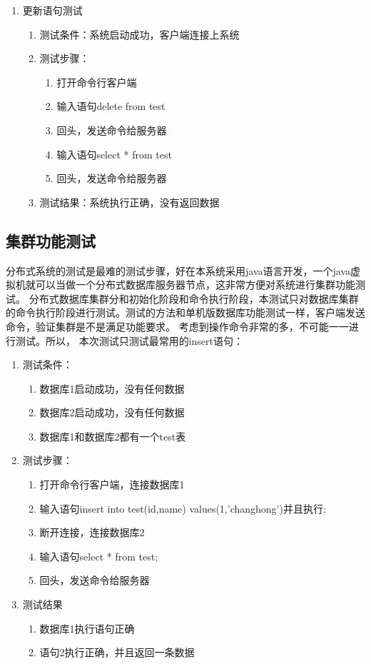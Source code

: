 \begin{enumerate}
\item 更新语句测试
\begin{enumerate}
	\item 测试条件：系统启动成功，客户端连接上系统
	\item 测试步骤：
	\begin{enumerate}
		\item 打开命令行客户端
		\item 输入语句delete from test
		\item 回头，发送命令给服务器
		\item 输入语句select * from test
		\item 回头，发送命令给服务器
	\end{enumerate}
	\item 	测试结果：系统执行正确，没有返回数据
\end{enumerate}	


\end{enumerate}	
\subsection{集群功能测试}
分布式系统的测试是最难的测试步骤，好在本系统采用java语言开发，一个java虚拟机就可以当做一个分布式数据库服务器节点，这非常方便对系统进行集群功能测试。
分布式数据库集群分和初始化阶段和命令执行阶段，本测试只对数据库集群的命令执行阶段进行测试。测试的方法和单机版数据库功能测试一样，客户端发送命令，验证集群是不是满足功能要求。
考虑到操作命令非常的多，不可能一一进行测试。所以，
本次测试只测试最常用的insert语句：
\begin{enumerate}
	\item 测试条件：
	\begin{enumerate}
		\item 数据库1启动成功，没有任何数据
		\item 数据库2启动成功，没有任何数据
		\item 数据库1和数据库2都有一个test表
	\end{enumerate}
	\item 测试步骤：
	\begin{enumerate}
		\item 打开命令行客户端，连接数据库1
		\item 输入语句insert into test(id,name) values(1,'changhong')并且执行;
		\item 断开连接，连接数据库2
		\item 输入语句select * from test;
		\item 回头，发送命令给服务器
	\end{enumerate}
	\item 	测试结果
	\begin{enumerate}
		\item 数据库1执行语句正确
		\item 语句2执行正确，并且返回一条数据
	\end{enumerate}
\end{enumerate}	
